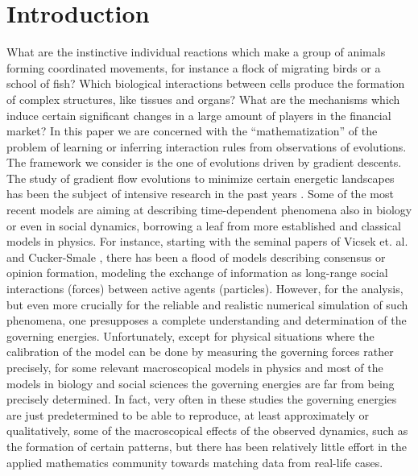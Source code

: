 \section{Introduction}

What are the instinctive individual reactions which make a group of animals forming coordinated movements, for instance a flock of migrating birds or a school of fish? Which biological interactions between cells produce the formation of complex structures, like tissues and organs? What are the mechanisms which induce certain significant changes in a large amount of players in the financial market? 
In this paper we are concerned with the ``mathematization'' of the problem of learning or inferring interaction rules from observations of evolutions. The framework we consider is the one of  evolutions driven by gradient descents.
The study of gradient flow evolutions to minimize  certain energetic landscapes has been the subject of intensive research in the past years \cite{AGS}. Some of the most recent models are  aiming at describing time-dependent phenomena also in biology or even in social dynamics, borrowing a leaf from more established and classical  models in physics. For instance, starting with the seminal papers of Vicsek et. al. \cite{VCBCS95} and Cucker-Smale \cite{CucSma07}, there has been a flood of models describing consensus or opinion formation,  modeling the exchange of information as long-range social interactions (forces) between active agents (particles). However, for the analysis, but even more crucially for the reliable and realistic numerical simulation of such phenomena, one presupposes a complete understanding and determination of the governing energies. Unfortunately, except for physical situations where the calibration of the model can be done by measuring the governing forces rather precisely, for some relevant macroscopical models in physics and most of the models in biology and social sciences the governing energies are far from being precisely determined. In fact, very often in these studies the governing energies are just predetermined to be able to reproduce, at least approximately or qualitatively, some of the macroscopical effects of the observed dynamics, such as the formation of certain patterns, but there has been relatively little effort in the applied mathematics community towards matching data from real-life cases. 

